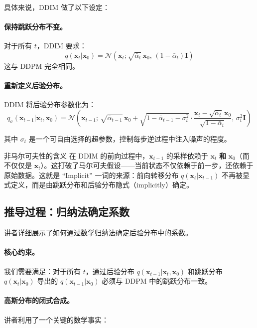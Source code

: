 具体来说，DDIM 做了以下设定：

\paragraph{保持跳跃分布不变。} 对于所有 $t$，DDIM 要求：
$$
q(\mathbf{x}_t | \mathbf{x}_0) = \mathcal{N}(\mathbf{x}_t; \sqrt{\bar{\alpha}_t}\,\mathbf{x}_0,\, (1-\bar{\alpha}_t)\mathbf{I})
$$
这与 DDPM 完全相同。

\paragraph{重新定义后验分布。} DDIM 将后验分布参数化为：
$$
q_\sigma(\mathbf{x}_{t-1} | \mathbf{x}_t, \mathbf{x}_0) = \mathcal{N}\left(\mathbf{x}_{t-1};\, \sqrt{\bar{\alpha}_{t-1}}\,\mathbf{x}_0 + \sqrt{1-\bar{\alpha}_{t-1}-\sigma_t^2}\cdot\frac{\mathbf{x}_t - \sqrt{\bar{\alpha}_t}\,\mathbf{x}_0}{\sqrt{1-\bar{\alpha}_t}},\, \sigma_t^2\mathbf{I}\right)
$$

其中 $\sigma_t$ 是一个可自由选择的超参数，控制每步逆过程中注入噪声的程度。

\begin{warningbox}{非马尔可夫性的含义}
在 DDIM 的前向过程中，$\mathbf{x}_{t-1}$ 的采样依赖于 $\mathbf{x}_t$ \textbf{和} $\mathbf{x}_0$（而不仅仅是 $\mathbf{x}_t$）。这打破了马尔可夫假设——当前状态不仅依赖于前一步，还依赖于原始数据。这就是 ``Implicit'' 一词的来源：前向转移分布 $q(\mathbf{x}_t|\mathbf{x}_{t-1})$ 不再被显式定义，而是由跳跃分布和后验分布隐式（implicitly）确定。
\end{warningbox}

\subsection{推导过程：归纳法确定系数}

讲者详细展示了如何通过数学归纳法确定后验分布中的系数。

\paragraph{核心约束。} 我们需要满足：对于所有 $t$，通过后验分布 $q(\mathbf{x}_{t-1}|\mathbf{x}_t, \mathbf{x}_0)$ 和跳跃分布 $q(\mathbf{x}_t|\mathbf{x}_0)$ 导出的 $q(\mathbf{x}_{t-1}|\mathbf{x}_0)$ 必须与 DDPM 中的跳跃分布一致。

\paragraph{高斯分布的闭式合成。} 讲者利用了一个关键的数学事实：

